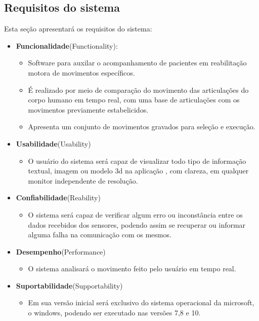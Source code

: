   \subsection{Requisitos do sistema}\label{sec:requisitosSistema}
   Esta seção apresentará os requisitos do sistema:
   \begin{itemize}
   \item \textbf{Funcionalidade}(Functionality):
     \begin{itemize}
     \item Software para auxilar o acompanhamento de pacientes em reabilitação
     motora de movimentos específicos.
     \item É realizado por meio de comparação do movimento das articulações do
      corpo humano em tempo real, com uma base de articulações com os movimentos
     previamente estabelicidos.
     \item Apresenta um conjunto de movimentos gravados para seleção e execução.
     \end{itemize}
   \item \textbf{Usabilidade}(Usability)
     \begin{itemize}
     \item O usuário do sistema será capaz de visualizar todo tipo de informação
      textual, imagem ou modelo 3d na aplicação , com clareza, em qualquer
     monitor independente de resolução.
     \end{itemize}
  \item \textbf{Confiabilidade}(Reability)
     \begin{itemize}
     \item O sistema será capaz de verificar algum erro ou inconstância entre os
      dados recebidos dos sensores, podendo assim se recuperar ou informar
     alguma falha na comunicação com os mesmos.
     \end{itemize}
  \item \textbf{Desempenho}(Performance)
     \begin{itemize}
     \item O sistema analisará o movimento feito pelo usuário em tempo real.
     \end{itemize}
  \item \textbf{Suportabilidade}(Supportability)
     \begin{itemize}
     \item Em sua versão inicial será exclusivo do sistema operacional da microsoft, o windows, podendo ser executado nas versões 7,8 e 10.
     \end{itemize}
   \end{itemize}




